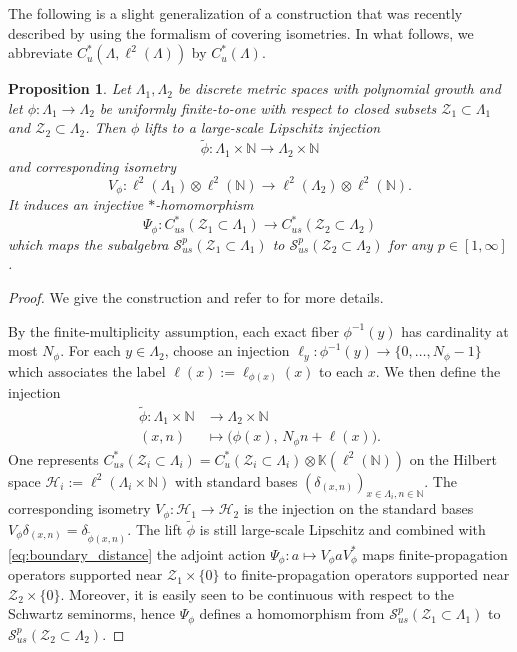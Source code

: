 \documentclass[12pt]{amsart}
\newtheorem{proposition}[theorem]{Proposition}
\newcommand{\NM}{{\mathbb N}}
\newcommand{\KM}{{\mathbb K}}
\newcommand{\Ss}{{\mathcal S}}
\newcommand{\Hh}{{\mathcal H}}
\newcommand{\Zz}{{\mathcal Z}}
\begin{document}
The following is a slight generalization of a construction that was recently described by \cite[Lemma 2.4]{krutoy2026bijective} using the formalism of covering isometries. In what follows, we abbreviate $C^*_u(\Lambda, \ell^2(\Lambda))$ by $C^*_u(\Lambda)$.
\begin{proposition}
\label{prop:cover_homomorphism}
Let $\Lambda_1,\Lambda_2$ be discrete metric spaces with polynomial growth and let $\phi:\Lambda_1\longrightarrow \Lambda_2$
be uniformly finite-to-one with respect to closed subsets $\Zz_1\subset \Lambda_1$ and $\Zz_2\subset \Lambda_2$. Then $\phi$ lifts to a large-scale Lipschitz injection
\[\widetilde\phi:\Lambda_1\times\mathbb N\longrightarrow \Lambda_2\times\mathbb N\]
and corresponding isometry 
\[V_\phi:\ell^2(\Lambda_1)\otimes\ell^2(\mathbb N)
\longrightarrow
\ell^2(\Lambda_2)\otimes\ell^2(\mathbb N).\]
It induces an injective $*$-homomorphism
$$\Psi_\phi:C^*_{us}(\Zz_1\subset \Lambda_1)\longrightarrow C^*_{us}(\Zz_2\subset \Lambda_2)$$
which maps the subalgebra $\Ss^p_{us}(\Zz_1\subset \Lambda_1)$ to $\Ss^p_{us}(\Zz_2\subset \Lambda_2)$ for any $p \in [1,\infty]$.
\end{proposition}
\begin{proof}
We give the construction and refer to \cite[Lemma~2.4]{krutoy2026bijective} for more details. 

By the finite-multiplicity assumption, each exact fiber
$\phi^{-1}(y)$ has cardinality at most $N_\phi$. For each
$y\in \Lambda_2$, choose an injection $\ell_y:\phi^{-1}(y)\longrightarrow \{0,\ldots,N_\phi-1\}$ which associates the label $\ell(x):=\ell_{\phi(x)}(x)$ to each $x$. 
We then define the injection
\begin{align*}
\widetilde\phi:\Lambda_1\times\mathbb N&\longrightarrow \Lambda_2\times\mathbb N \\
(x,n) &\longmapsto \big(\phi(x),\,N_\phi n+\ell(x)\big).
\end{align*}
One represents
$C^*_{us}(\Zz_i \subset \Lambda_i) = C^*_u(\Zz_i\subset \Lambda_i)\otimes \KM(\ell^2(\mathbb N))$ on the Hilbert space $\Hh_i:=\ell^2(\Lambda_i\times\NM)$ with standard bases $(\delta_{(x,n)})_{x\in \Lambda_i,n\in \NM}$.
The corresponding isometry $V_\phi:\Hh_1\longrightarrow \Hh_2$ is the injection on the standard bases
$V_\phi\delta_{(x,n)}= \delta_{\widetilde\phi(x,n)}.$  The lift $\tilde{\phi}$ is still large-scale Lipschitz and combined with \eqref{eq:boundary_distance} the adjoint action $\Psi_\phi: a\longmapsto V_\phi a V_\phi^*$ maps finite-propagation operators supported near $\Zz_1\times \{0\}$ to finite-propagation operators supported near $\Zz_2\times \{0\}$. Moreover, it is easily seen to be continuous with respect to the Schwartz seminorms, hence $\Psi_\phi$ defines a homomorphism from $\Ss^p_{us}(\Zz_1 \subset \Lambda_1)$ to $\Ss^p_{us}(\Zz_2 \subset \Lambda_2)$.
\end{proof}
\end{document}
